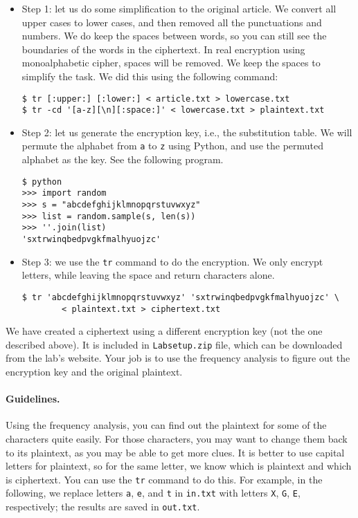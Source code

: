 \begin{itemize}

\item Step 1: let us do some simplification to the original article. 
We convert all upper cases to lower cases, and then
removed all the punctuations and numbers.  We do keep the spaces between words, so
you can still see the boundaries of the words in the ciphertext. 
In real encryption using monoalphabetic cipher,
spaces will be removed. We keep the spaces to simplify the task. We did this using the 
following command:

\begin{lstlisting}
$ tr [:upper:] [:lower:] < article.txt > lowercase.txt
$ tr -cd '[a-z][\n][:space:]' < lowercase.txt > plaintext.txt
\end{lstlisting}


\item Step 2: let us generate the encryption key, i.e., the substitution table.
We will permute the alphabet from \texttt{a}
to \texttt{z} using Python, and use the permuted alphabet as the key. See the following program.   

\begin{lstlisting}
$ python
>>> import random
>>> s = "abcdefghijklmnopqrstuvwxyz"
>>> list = random.sample(s, len(s))
>>> ''.join(list)
'sxtrwinqbedpvgkfmalhyuojzc'
\end{lstlisting}
 

\item Step 3: we use the \texttt{tr} command to do the encryption. 
We only encrypt letters, while leaving the space and return characters alone. 


\begin{lstlisting}
$ tr 'abcdefghijklmnopqrstuvwxyz' 'sxtrwinqbedpvgkfmalhyuojzc' \
        < plaintext.txt > ciphertext.txt
\end{lstlisting}

\end{itemize}


We have created a ciphertext using a different encryption key (not the one described above).
It is included in \texttt{Labsetup.zip} file, which  
can be downloaded from the lab's website. Your job is to use the frequency analysis 
to figure out the encryption key and the original plaintext.  



\paragraph{Guidelines.} Using the frequency analysis, you can find 
out the plaintext for some of the characters quite easily. For those characters, you may want
to change them back to its plaintext, as you may be able to get more clues. 
It is better to use capital letters for plaintext, so for the same letter, we 
know which is plaintext and which is ciphertext. 
You can use the \texttt{tr} command to do this. For example, in the following,
we replace letters \texttt{a}, \texttt{e}, and \texttt{t} in
\texttt{in.txt} with letters \texttt{X}, \texttt{G}, \texttt{E}, respectively;
the results are saved in \texttt{out.txt}. 


